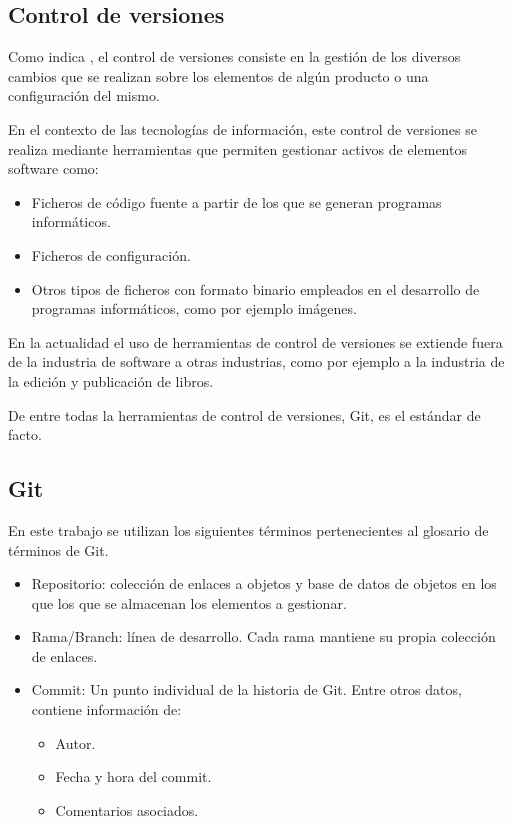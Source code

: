 \subsection{Control de versiones}

Como indica \cite{wiki:control-versiones}, el control de versiones consiste en la  gestión de los diversos cambios que se realizan sobre los elementos de algún producto o una configuración del mismo.

En el contexto de las tecnologías de información, este control de versiones se realiza mediante herramientas que permiten gestionar activos de elementos software como:

\begin{itemize}
	\item Ficheros de código fuente a partir de los que se generan programas informáticos.
	\item Ficheros de configuración.
	\item Otros tipos de ficheros con formato binario empleados en el desarrollo de programas informáticos, como por ejemplo imágenes.
\end{itemize}

En la actualidad el uso de herramientas de control de versiones se extiende fuera de la industria de software a otras industrias, como por ejemplo a la industria de la edición y publicación de libros.

De entre todas la herramientas de control de versiones, Git, es el estándar de facto.

\subsection{Git}

En este trabajo se utilizan los siguientes términos pertenecientes al glosario de términos \cite{gitglossary} de Git.

\begin{itemize}
	\item Repositorio: colección de enlaces a objetos y base de datos de objetos en los que los que se almacenan los elementos a gestionar.
	\item Rama/Branch: línea de desarrollo. Cada rama mantiene su propia colección de enlaces.
	\item Commit: Un punto individual de la historia de Git. Entre otros datos, contiene información de:
		\begin{itemize}
			\item Autor.
			\item Fecha y hora del commit.
			\item Comentarios asociados.
		\end{itemize}
\end{itemize}

